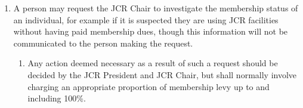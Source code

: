 \begin{enumerate}
    \item A person may request the JCR Chair to investigate the membership status of an individual, for example if it is suspected they are using JCR facilities without having paid membership dues, though this information will not be communicated to the person making the request.
    \begin{enumerate}
        \item Any action deemed necessary as a result of such a request should be decided by the JCR President and JCR Chair, but shall normally involve charging an appropriate proportion of membership levy up to and including 100\%.
    \end{enumerate}
\end{enumerate}

